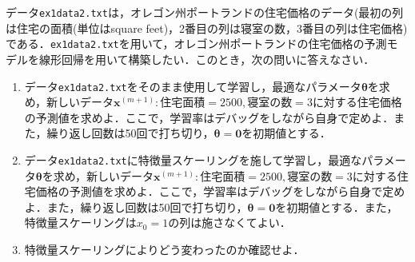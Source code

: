 \begin{qu}\label{qu_lr2_1}
データ\texttt{ex1data2.txt}は，オレゴン州ポートランドの住宅価格のデータ(最初の列は住宅の面積(単位はsquare feet)，2番目の列は寝室の数，3番目の列は住宅価格)である．\texttt{ex1data2.txt}を用いて，オレゴン州ポートランドの住宅価格の予測モデルを線形回帰を用いて構築したい．このとき，次の問いに答えなさい．
\begin{enumerate}
\item データ\texttt{ex1data2.txt}をそのまま使用して学習し，最適なパラメータ${\bm \theta}$を求め，新しいデータ${\bm x}^{(m+1)}:住宅面積=2500, 寝室の数=3$に対する住宅価格の予測値を求めよ．ここで，学習率はデバッグをしながら自身で定めよ．また，繰り返し回数は50回で打ち切り，${\bm \theta}={\bm 0}$を初期値とする．
\item データ\texttt{ex1data2.txt}に特徴量スケーリングを施して学習し，最適なパラメータ${\bm \theta}$を求め，新しいデータ${\bm x}^{(m+1)}:住宅面積=2500, 寝室の数=3$に対する住宅価格の予測値を求めよ．ここで，学習率はデバッグをしながら自身で定めよ．また，繰り返し回数は50回で打ち切り，${\bm \theta}={\bm 0}$を初期値とする．また，特徴量スケーリングは$x_0=1$の列は施さなくてよい．
\item 特徴量スケーリングによりどう変わったのか確認せよ．
\end{enumerate}
\end{qu}
